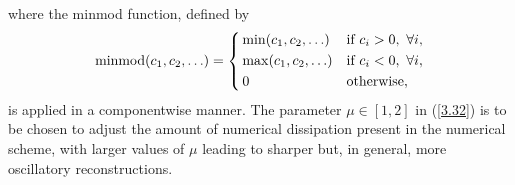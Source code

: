 \documentclass[a4paper,11pt,twoside]{article}
\numberwithin{equation}{section}
\numberwithin{figure}{section}
\numberwithin{table}{section}
\newcommand\eref[1]{(\ref{#1})}
\begin{document}
where the minmod function, defined by
\begin{equation*}
{\rm minmod}(c_1,c_2,\ldots)=\left\{\begin{aligned}
&\min(c_1,c_2,\ldots)&&\mbox{if}~c_i>0,~\forall i,\\
&\max(c_1,c_2,\ldots)&&\mbox{if}~c_i<0,~\forall i,\\
&\,0&&\mbox{otherwise},
\end{aligned}\right.
\end{equation*}
is applied in a componentwise manner. The parameter $\mu\in[1,2]$ in \eref{3.32} is to be chosen to adjust the amount of numerical
dissipation present in the numerical scheme, with larger values of $\mu$ leading to sharper but, in general, more oscillatory
reconstructions. 
	
\end{document}

